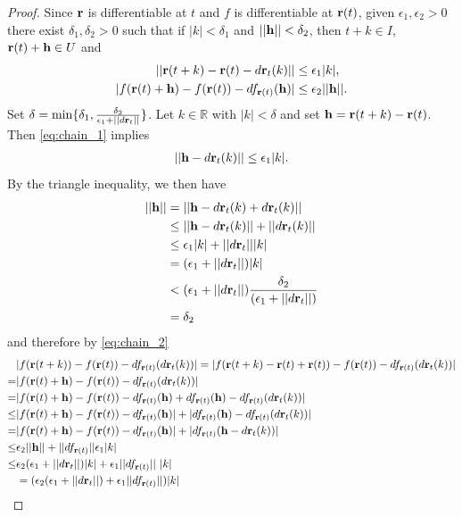 \documentclass[12pt,letterpaper,reqno]{article}
\numberwithin{equation}{section}
\newcommand{\bh}{{\bf h}}
\newcommand{\R}{\ensuremath{\mathbb R}}
\newcommand{\bbr}{{\bf r}}
\begin{document}
{\begin{proof}
	Since $\bbr$ is differentiable at $t$ and $f$ is differentiable at $\bbr(t)$, given $\epsilon_1,\epsilon_2>0$ there exist $\delta_1,\delta_2>0$ such that if $|k|<\delta_1$ and $||\bh||<\delta_2$, then $t+k \in I$, $\bbr(t)+\bh \in U$ and 
	\begin{align}\label{eq:chain_1}
		||\bbr(t+k)-\bbr(t)-d\bbr_t(k)|| &\leq \epsilon_1|k|, \\ \label{eq:chain_2}
		|f(\bbr(t)+\bh)-f(\bbr(t))-df_{\bbr(t)}(\bh)|&\leq \epsilon_2||\bh||.
	\end{align}
Set $\delta=\min\{\delta_1,\frac{\delta_2}{\epsilon_1+||d\bbr_t||}\}$. Let $k \in \R$ with $|k|<\delta$ and set $\bh=\bbr(t+k)-\bbr(t)$. Then \eqref{eq:chain_1} implies
\begin{align*}
	||\bh-d\bbr_t(k)|| \leq \epsilon_1|k|.
\end{align*}
By the triangle inequality, we then have
\begin{align*}
	||\bh||&=||\bh-d\bbr_t(k)+d\bbr_t(k)|| \\
	&\leq ||\bh-d\bbr_t(k)||+||d\bbr_t(k)|| \\
	&\leq \epsilon_1 |k|+||d\bbr_t|| |k| \\
	&=(\epsilon_1+||d\bbr_t||)|k| \\
	& < (\epsilon_1+||d\bbr_t||) \frac{\delta_2}{(\epsilon_1+||d\bbr_t||) } \\
	&=\delta_2
\end{align*}
and therefore by \eqref{eq:chain_2}
\begin{align*}
	&|f(\bbr(t+k))-f(\bbr(t))-df_{\bbr(t)}(d\bbr_t(k))|=|f(\bbr(t+k)-\bbr(t)+\bbr(t))-f(\bbr(t))-df_{\bbr(t)}(d\bbr_t(k))| \\
	=&|f(\bbr(t)+\bh)-f(\bbr(t))-df_{\bbr(t)}(d\bbr_t(k))| \\
	=&|f(\bbr(t)+\bh)-f(\bbr(t))-df_{\bbr(t)}(\bh)+df_{\bbr(t)}(\bh)-df_{\bbr(t)}(d\bbr_t(k))| \\
	\leq & |f(\bbr(t)+\bh)-f(\bbr(t))-df_{\bbr(t)}(\bh)|+|df_{\bbr(t)}(\bh)-df_{\bbr(t)}(d\bbr_t(k))| \\
	=& |f(\bbr(t)+\bh)-f(\bbr(t))-df_{\bbr(t)}(\bh)|+|df_{\bbr(t)}(\bh-d\bbr_t(k))| \\
	\leq & \epsilon_2||\bh||+||df_{\bbr(t)}||\epsilon_1|k| \\
	\leq &\epsilon_2(\epsilon_1+||d\bbr_t||)|k|+\epsilon_1||df_{\bbr(t)}|| \ |k| \\
	&=(\epsilon_2(\epsilon_1+||d\bbr_t||)+\epsilon_1||df_{\bbr(t)}||)|k|
\end{align*}

\end{proof}}
\end{document}
